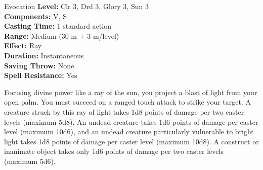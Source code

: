 {Evocation}
{
	\textbf{Level:}
	Clr 3, Drd 3, Glory 3, Sun 3\\
	\textbf{Components:}
	V, S\\
	\textbf{Casting Time:}
	1 standard action\\
	\textbf{Range:}
	Medium (30 m + 3 m/level)\\
	\textbf{Effect:}
	Ray\\
	\textbf{Duration:}
	Instantaneous\\
	\textbf{Saving Throw:}
	None\\
	\textbf{Spell Resistance:}
	Yes\\
}
{
	Focusing divine power like a ray of the sun, you project a blast of light from your open palm. You must succeed on a ranged touch attack to strike your target. A creature struck by this ray of light takes 1d8 points of damage per two caster levels (maximum 5d8). An undead creature takes 1d6 points of damage per caster level (maximum 10d6), and an undead creature particularly vulnerable to bright light takes 1d8 points of damage per caster level (maximum 10d8). A construct or inanimate object takes only 1d6 points of damage per two caster levels (maximum 5d6).

}
